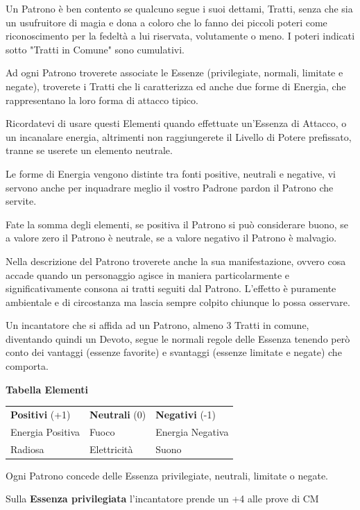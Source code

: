 \documentclass[a4paper,11pt,twoside,openany]{book}
\begin{document}
{Un Patrono è ben contento se qualcuno segue i suoi dettami, Tratti, senza che sia un usufruitore di magia e dona a coloro che lo fanno dei piccoli poteri come riconoscimento per la fedeltà a lui riservata, volutamente o meno. I poteri indicati sotto "Tratti in Comune" sono cumulativi.

Ad ogni Patrono troverete associate le Essenze (privilegiate, normali, limitate e negate), troverete i Tratti che li caratterizza ed anche due forme di Energia, che rappresentano la loro forma di attacco tipico. 

Ricordatevi di usare questi Elementi quando effettuate un'Essenza di Attacco, o un incanalare energia, altrimenti non raggiungerete il Livello di Potere prefissato, tranne se userete un elemento neutrale. 

Le forme di Energia vengono distinte tra fonti positive, neutrali e negative, vi servono anche per inquadrare meglio il vostro Padrone pardon il Patrono che servite.

Fate la somma degli elementi, se positiva il Patrono si può considerare buono, se a valore zero il Patrono è neutrale, se a valore negativo il Patrono è malvagio.

Nella descrizione del Patrono troverete anche la sua manifestazione, ovvero cosa accade quando un personaggio agisce in maniera particolarmente e significativamente consona ai tratti seguiti dal Patrono. L'effetto è puramente ambientale e di circostanza ma lascia sempre colpito chiunque lo possa osservare.

Un incantatore che si affida ad un Patrono, almeno 3 Tratti in comune, diventando quindi un Devoto, segue le normali regole delle Essenza tenendo però conto dei vantaggi (essenze favorite) e svantaggi (essenze limitate e negate) che comporta.

\bigskip

\textbf{Tabella Elementi}
\medskip

\begin{tabular}{lll}
\toprule
\textbf{Positivi} (+1) & \textbf{Neutrali} (0) & \textbf{Negativi} (-1)\tabularnewline
Energia Positiva & Fuoco & Energia Negativa\tabularnewline
Radiosa & Elettricità & Suono\tabularnewline
\end{tabular}
\bigskip

Ogni Patrono concede delle Essenza privilegiate, neutrali, limitate o negate.

Sulla \textbf{Essenza privilegiata} l'incantatore prende un +4 alle prove di CM

}
\end{document}
